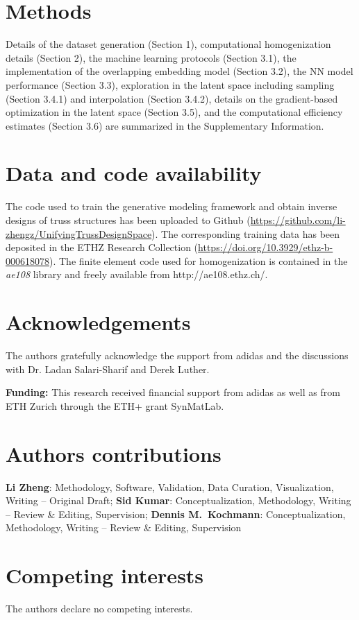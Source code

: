 \documentclass[fleqn,10pt]{wlscirep}
\begin{document}
\section*{Methods}
Details of the dataset generation (Section 1), computational homogenization details (Section 2), the machine learning protocols (Section 3.1), the implementation of the overlapping embedding model (Section 3.2), the NN model performance (Section 3.3), exploration in the latent space including sampling (Section 3.4.1) and interpolation (Section 3.4.2), details on the gradient-based optimization in the latent space (Section 3.5), and the computational efficiency estimates (Section 3.6) are summarized in the Supplementary Information.

\section*{Data and code availability} The code used to train the generative modeling framework and obtain inverse designs of truss structures has been uploaded to Github (\url{https://github.com/li-zhengz/UnifyingTrussDesignSpace}). The corresponding training data has been deposited in the ETHZ Research Collection (\url{https://doi.org/10.3929/ethz-b-000618078}). The finite element code used for homogenization is contained in the \emph{ae108} library and freely available from http://ae108.ethz.ch/.

\section*{Acknowledgements}
The authors gratefully acknowledge the support from adidas and the discussions with Dr. Ladan Salari-Sharif and Derek Luther.

\textbf{Funding:} This research received financial support from adidas as well as from ETH Zurich through the ETH+ grant SynMatLab.

\section*{Authors contributions}
\textbf{Li Zheng}: Methodology, Software, Validation, Data Curation, Visualization, Writing -- Original Draft; \textbf{Sid Kumar}: Conceptualization, Methodology, Writing -- Review \& Editing, Supervision; \textbf{Dennis M.~Kochmann}: Conceptualization, Methodology, Writing -- Review \& Editing, Supervision

\section*{Competing interests} The authors declare no competing interests.




\end{document}
